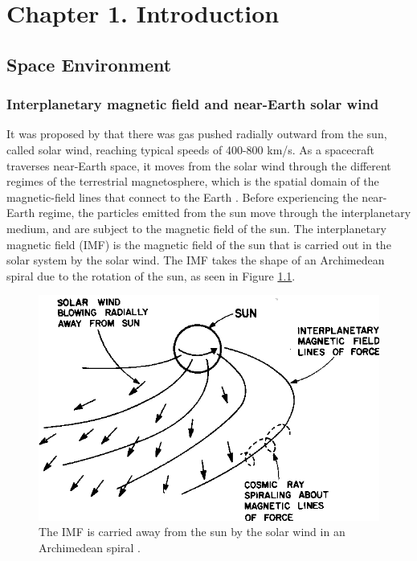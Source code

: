 \chapter{Chapter 1. Introduction}

\section{Space Environment}

\subsection{Interplanetary magnetic field and near-Earth solar wind}
It was proposed by \cite{Parker:1958} that there was gas pushed radially outward from the sun, called solar wind, reaching typical speeds of 400-800 km/s. As a spacecraft traverses near-Earth space, it moves from the solar wind through the different regimes of the terrestrial magnetosphere, which is the spatial domain of the magnetic-field lines that connect to the Earth \citep{Borovsky:2018}. Before experiencing the near-Earth regime, the particles emitted from the sun move through the interplanetary medium, and are subject to the magnetic field of the sun. The interplanetary magnetic field (\gls{IMF}) is the magnetic field of the sun that is carried out in the solar system by the solar wind. The IMF takes the shape of an Archimedean spiral due to the rotation of the sun, as seen in Figure \ref{fig:IMF-spiral}.

\begin{figure}
    \centering
    \includegraphics[width=\linewidth]{Figures/IMF.png}
    \caption[Diagram of the interplanetary magnetic field]{The IMF is carried away from the sun by the solar wind in an Archimedean spiral \citep{Mccracken:1967}.}
    \label{fig:IMF-spiral}
\end{figure}

